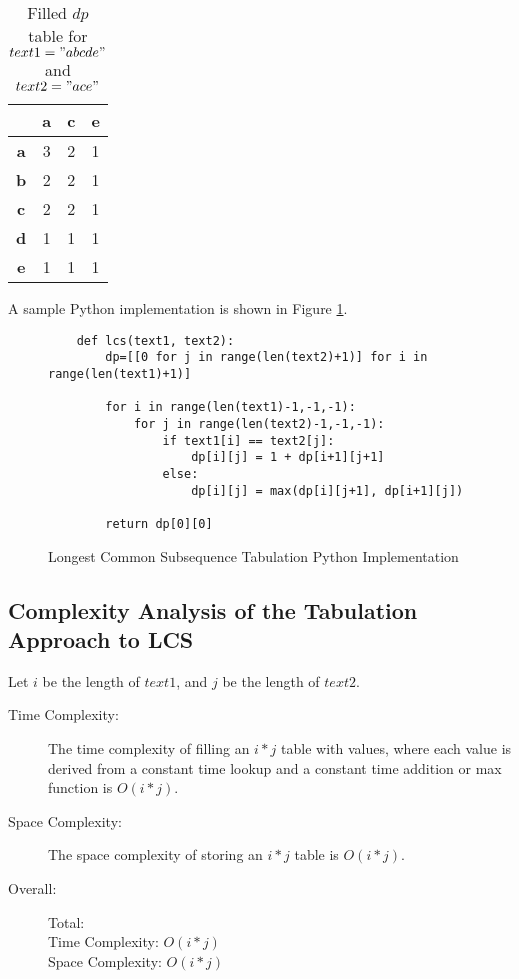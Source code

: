 \begin{table}[htbp]
    \centering
    \begin{tabular}{|c|c|c|c|}
        \hline
          & \textbf{a} & \textbf{c} & \textbf{e} \\
        \hline
        \textbf{a} & 3 & 2 & 1 \\
        \hline
        \textbf{b} & 2 & 2 & 1  \\
        \hline
        \textbf{c} & 2 & 2 & 1  \\
        \hline
        \textbf{d} & 1 & 1 & 1 \\
        \hline
        \textbf{e} & 1 & 1 & 1  \\
        \hline
    \end{tabular}
    \label{tab:lcs-dp-table}
    \caption{Filled $dp$ table for $text1="abcde"$ and $text2="ace"$}
\end{table}


A sample Python implementation is shown in Figure \ref{fig:lcs-dp}.

\begin{figure}[H]
    \centering
    \begin{lstlisting}
    def lcs(text1, text2):
        dp=[[0 for j in range(len(text2)+1)] for i in range(len(text1)+1)]
    
        for i in range(len(text1)-1,-1,-1):
            for j in range(len(text2)-1,-1,-1):
                if text1[i] == text2[j]:
                    dp[i][j] = 1 + dp[i+1][j+1]
                else:
                    dp[i][j] = max(dp[i][j+1], dp[i+1][j])
    
        return dp[0][0]
    \end{lstlisting}
    \caption{Longest Common Subsequence Tabulation Python Implementation}
    \label{fig:lcs-dp}
\end{figure}
\newpage
\subsection{Complexity Analysis of the Tabulation Approach to LCS}\label{subsec:ca-lcs-dp}

Let $i$ be the length of $text1$, and $j$ be the length of $text2$.

\begin{description}
    \item[Time Complexity:]
        The time complexity of filling an $i * j$ table with values, where each value is derived from a constant time lookup and a constant time addition or max function is $O(i * j)$.

    \item[Space Complexity:] 
        The space complexity of storing an $i * j$ table is $O(i * j)$.

        
    \item[Overall:] Total:\\
        Time Complexity: $O(i * j)$\\
        Space Complexity: $O(i * j)$
    
\end{description}

